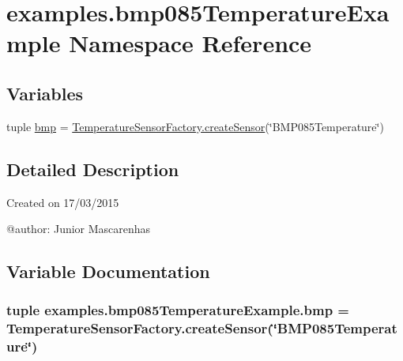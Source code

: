 \hypertarget{namespaceexamples_1_1bmp085TemperatureExample}{}\section{examples.\+bmp085\+Temperature\+Example Namespace Reference}
\label{namespaceexamples_1_1bmp085TemperatureExample}
\subsection*{Variables}
\begin{DoxyCompactItemize}
\item 
tuple \hyperlink{namespaceexamples_1_1bmp085TemperatureExample_aee3e90190394ffede28fce79de67a10f}{bmp} = \hyperlink{classconcretefactory_1_1temperatureSensorFactory_1_1TemperatureSensorFactory_a10da40452b9fced7f217c6716e8d5ecc}{Temperature\+Sensor\+Factory.\+create\+Sensor}(\char`\"{}B\+M\+P085\+Temperature\char`\"{})
\end{DoxyCompactItemize}


\subsection{Detailed Description}
\begin{DoxyVerb}Created on 17/03/2015

@author: Junior Mascarenhas
\end{DoxyVerb}
 

\subsection{Variable Documentation}
\hypertarget{namespaceexamples_1_1bmp085TemperatureExample_aee3e90190394ffede28fce79de67a10f}{}
\subsubsection[{bmp}]{\setlength{\rightskip}{0pt plus 5cm}tuple examples.\+bmp085\+Temperature\+Example.\+bmp = {\bf Temperature\+Sensor\+Factory.\+create\+Sensor}(\char`\"{}B\+M\+P085\+Temperature\char`\"{})}\label{namespaceexamples_1_1bmp085TemperatureExample_aee3e90190394ffede28fce79de67a10f}
